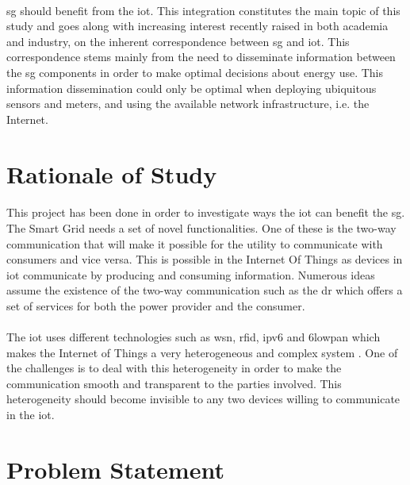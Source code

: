 \documentclass[oneside,12pt,a4paper,final]{book}
\begin{document}
\paragraph{}
\gls{sg} should benefit from the \gls{iot}. This integration constitutes the main topic of this study and goes along with increasing interest recently raised in both academia and industry, on the inherent correspondence between \gls{sg} and \gls{iot}. This  correspondence stems mainly from the need to disseminate information between the \gls{sg} components in order to make optimal decisions about energy use. This information dissemination could only be optimal when deploying ubiquitous sensors and meters, and using the available network infrastructure, i.e. the Internet.   


\section{Rationale of Study}
\paragraph{}
This project has been done in order to investigate ways the \gls{iot} can benefit the \gls{sg}. The Smart Grid needs a set of novel functionalities. One of these is the two-way communication that will make it possible for the utility to communicate with consumers and vice versa. This is possible in the Internet Of Things as devices in \gls{iot} communicate by producing and consuming information. Numerous ideas assume the existence of the two-way communication such as the \gls{dr} which offers a set of services for both the power provider and the consumer.
\paragraph{}
The \gls{iot} uses different technologies such as \gls{wsn}, \gls{rfid}, \gls{ipv6} and \gls{6lowpan} which makes the Internet of Things a very heterogeneous and complex system \cite{ref4}. One of the challenges is to deal with this heterogeneity in order to make the communication smooth and transparent to the parties involved. This heterogeneity should become invisible to any two devices willing to communicate in the \gls{iot}.

\section{Problem Statement}
\end{document}
